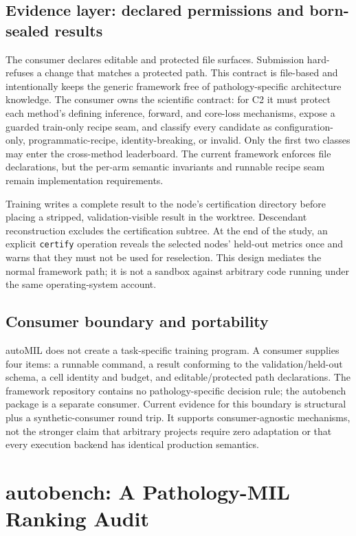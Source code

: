 \documentclass{article}
\newcommand{\ours}{\textsf{autoMIL}\xspace}
\newcommand{\autobench}{\textsf{autobench}\xspace}
\begin{document}
\subsection{Evidence layer: declared permissions and born-sealed results}

The consumer declares editable and protected file surfaces.  Submission
hard-refuses a change that matches a protected path.  This contract is
file-based and intentionally keeps the generic framework free of
pathology-specific architecture knowledge.  The consumer owns the scientific
contract: for C2 it must protect each method's defining inference, forward, and
core-loss mechanisms, expose a guarded train-only recipe seam, and classify
every candidate as configuration-only, programmatic-recipe, identity-breaking,
or invalid.  Only the first two classes may enter the cross-method leaderboard.
The current framework enforces file declarations, but the per-arm semantic
invariants and runnable recipe seam remain implementation requirements.

Training writes a complete result to the node's certification directory before
placing a stripped, validation-visible result in the worktree.  Descendant
reconstruction excludes the certification subtree.  At the end of the study,
an explicit \texttt{certify} operation reveals the selected nodes' held-out
metrics once and warns that they must not be used for reselection.  This design
mediates the normal framework path; it is not a sandbox against arbitrary code
running under the same operating-system account.

\subsection{Consumer boundary and portability}

\ours does not create a task-specific training program.  A consumer supplies
four items: a runnable command, a result conforming to the validation/held-out
schema, a cell identity and budget, and editable/protected path declarations.
The framework repository contains no pathology-specific decision rule; the
\autobench package is a separate consumer.  Current evidence for this boundary
is structural plus a synthetic-consumer round trip.  It supports
consumer-agnostic mechanisms, not the stronger claim that arbitrary projects
require zero adaptation or that every execution backend has identical
production semantics.

\section{\autobench: A Pathology-MIL Ranking Audit}
\label{sec:autobench}
\end{document}
